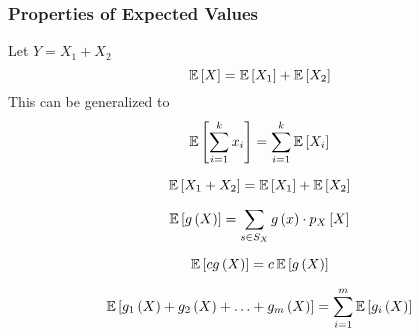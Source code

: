 		\subsubsection{Properties of Expected Values} \label{subsubsec:Properties of Discrete Expected Value}
			\begin{definition} \label{def:Linearity of Expectation}
				Let $Y = X_{1} + X_{2}$
				\begin{equation}
					\operatorname{\operatorname{\mathbb{E}}} \left[ X \right] = \operatorname{\operatorname{\mathbb{E}}} \left[ X_{1} \right] + \operatorname{\operatorname{\mathbb{E}}} \left[ X_{2} \right]
				\end{equation}
				This can be generalized to
				\begin{equation} \label{eq:General Linearity of Expectation}
					\operatorname{\operatorname{\mathbb{E}}} \left[ \sum_{i=1}^{k} x_{i} \right] = \sum_{i=1}^{k} \operatorname{\operatorname{\mathbb{E}}} \left[ X_{i} \right]
				\end{equation}
			\end{definition}
			\begin{propertylist}
				\item
					\begin{equation}
						\operatorname{\operatorname{\mathbb{E}}} \left[ X_{1} + X_{2} \right] = \operatorname{\operatorname{\mathbb{E}}} \left[ X_{1} \right] + \operatorname{\operatorname{\mathbb{E}}} \left[ X_{2} \right]
					\end{equation}
				\item
					\begin{equation}
						\operatorname{\operatorname{\mathbb{E}}} \left[ g \left( X \right) \right] = \sum\limits_{s \in S_{X}} g \left( x \right) \cdot p_{X} \left[ X \right]
					\end{equation}
				\item
					\begin{equation}
						\operatorname{\operatorname{\mathbb{E}}} \left[ c g\left( X \right) \right] = c \operatorname{\operatorname{\mathbb{E}}} \left[ g\left( X \right) \right]
					\end{equation}
				\item
					\begin{equation}
						\operatorname{\operatorname{\mathbb{E}}} \left[ g_{1} \left( X \right) + g_{2} \left( X \right) + \ldots + g_{m} \left( X \right) \right] = \sum\limits_{i=1}^{m} \operatorname{\operatorname{\mathbb{E}}} \left[ g_{i} \left( X \right) \right]
					\end{equation}
			\end{propertylist}
		
